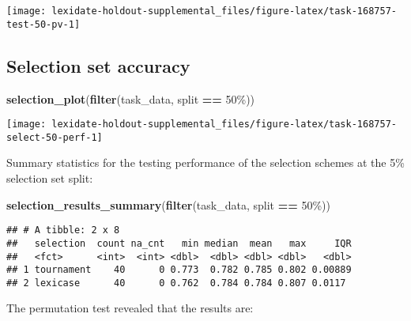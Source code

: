 \documentclass[
]{book}
\newenvironment{Shaded}{\begin{snugshade}}{\end{snugshade}}
\newcommand{\FunctionTok}[1]{\textcolor[rgb]{0.13,0.29,0.53}{\textbf{#1}}}
\newcommand{\NormalTok}[1]{#1}
\newcommand{\SpecialCharTok}[1]{\textcolor[rgb]{0.81,0.36,0.00}{\textbf{#1}}}
\newcommand{\StringTok}[1]{\textcolor[rgb]{0.31,0.60,0.02}{#1}}
\begin{document}
\texttt{[image: lexidate-holdout-supplemental\_files/figure-latex/task-168757-test-50-pv-1]}

\hypertarget{selection-set-accuracy-22}{%
\subsection{Selection set accuracy}\label{selection-set-accuracy-22}}

\begin{Shaded}
\begin{Highlighting}[]
\FunctionTok{selection\_plot}\NormalTok{(}\FunctionTok{filter}\NormalTok{(task\_data, split }\SpecialCharTok{==} \StringTok{\textquotesingle{}50\%\textquotesingle{}}\NormalTok{))}
\end{Highlighting}
\end{Shaded}

\texttt{[image: lexidate-holdout-supplemental\_files/figure-latex/task-168757-select-50-perf-1]}

Summary statistics for the testing performance of the selection schemes at the 5\% selection set split:

\begin{Shaded}
\begin{Highlighting}[]
\FunctionTok{selection\_results\_summary}\NormalTok{(}\FunctionTok{filter}\NormalTok{(task\_data, split }\SpecialCharTok{==} \StringTok{\textquotesingle{}50\%\textquotesingle{}}\NormalTok{))}
\end{Highlighting}
\end{Shaded}

\begin{verbatim}
## # A tibble: 2 x 8
##   selection  count na_cnt   min median  mean   max     IQR
##   <fct>      <int>  <int> <dbl>  <dbl> <dbl> <dbl>   <dbl>
## 1 tournament    40      0 0.773  0.782 0.785 0.802 0.00889
## 2 lexicase      40      0 0.762  0.784 0.784 0.807 0.0117
\end{verbatim}

The permutation test revealed that the results are:
\end{document}
